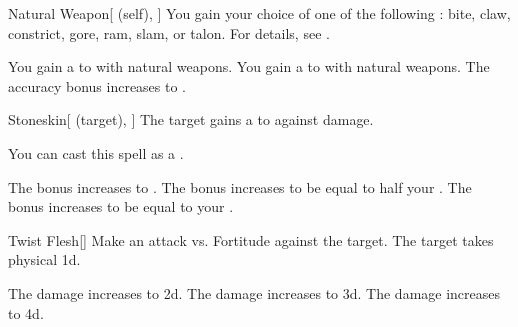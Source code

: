 \lowercase{\hypertarget{spell:Natural Weapon}{}}\label{spell:Natural Weapon}
\begin{attuneability}[Rank 1]{\hypertarget{spell:Natural Weapon}{Natural Weapon}}[ (self), ]
You gain your choice of one of the following : bite, claw, constrict, gore, ram, slam, or talon.
For details, see .

\rankline
{} You gain a   to  with natural weapons.
 You gain a   to  with natural weapons.
 The accuracy bonus increases to .
\end{attuneability}
\vspace{0.25em}



\lowercase{\hypertarget{spell:Stoneskin}{}}\label{spell:Stoneskin}
\begin{attuneability}[Rank 1]{\hypertarget{spell:Stoneskin}{Stoneskin}}[ (target), ]
The target gains a   to  against  damage.

You can cast this spell as a .

\rankline
{} The bonus increases to .
 The bonus increases to be equal to half your .
 The bonus increases to be equal to your .
\end{attuneability}
\vspace{0.25em}



\lowercase{\hypertarget{spell:Twist Flesh}{}}\label{spell:Twist Flesh}
\begin{freeability}[Rank 1]{\hypertarget{spell:Twist Flesh}{Twist Flesh}}[]
Make an attack vs. Fortitude against the target.
\hit The target takes physical  \plus1d.

\rankline
{} The damage increases to  \plus2d.
 The damage increases to  \plus3d.
 The damage increases to  \plus4d.
\end{freeability}
\vspace{0.25em}



